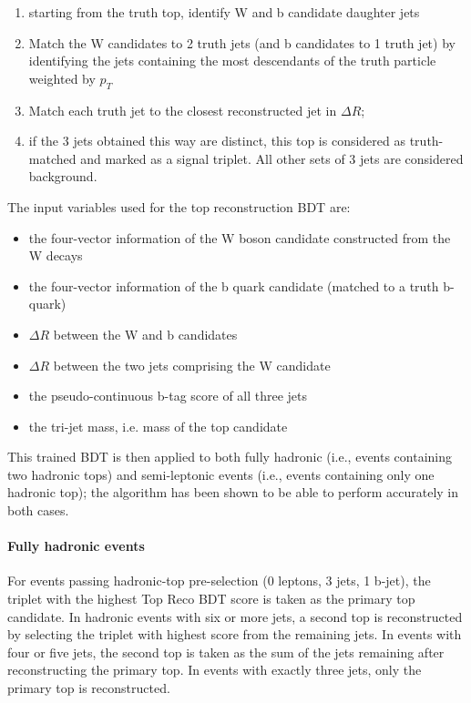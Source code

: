 \begin{enumerate}
	\item starting from the truth top, identify W and b candidate daughter jets
	\item Match the W candidates to 2 truth jets (and b candidates to 1 truth jet) by identifying the jets containing the most descendants of the truth particle weighted by $p_{T}$
	\item Match each truth jet to the closest reconstructed jet in $\Delta R$;
	\item if the 3 jets obtained this way are distinct, this top is considered as truth-matched and marked as a signal triplet. All other sets of 3 jets are considered background.
\end{enumerate}

The input variables used for the top reconstruction BDT are:
\begin{itemize}
	\item the four-vector information of the W boson candidate constructed from the W decays
	\item the four-vector information of the b quark candidate (matched to a truth b-quark)
	\item $\Delta R$ between the W and b candidates
	\item $\Delta R$ between the two jets comprising the W candidate
	\item the pseudo-continuous b-tag score of all three jets
	\item the tri-jet mass, i.e. mass of the top candidate
\end{itemize}

This trained BDT is then applied to both fully hadronic (i.e., events containing two hadronic tops) and semi-leptonic events (i.e., events containing only one hadronic top); the algorithm has been shown to be able to perform accurately in both cases.


\paragraph{Fully hadronic events}
For events passing hadronic-top pre-selection (0 leptons, 3 jets, 1 b-jet), the triplet with the highest Top Reco BDT score is taken as the primary top candidate. In hadronic events with six or more jets, a second top is reconstructed by selecting the triplet with highest score from the remaining jets. In events with four or five jets, the second top is taken as the sum of the jets remaining after reconstructing the primary top. In events with exactly three jets, only the primary top is reconstructed.


